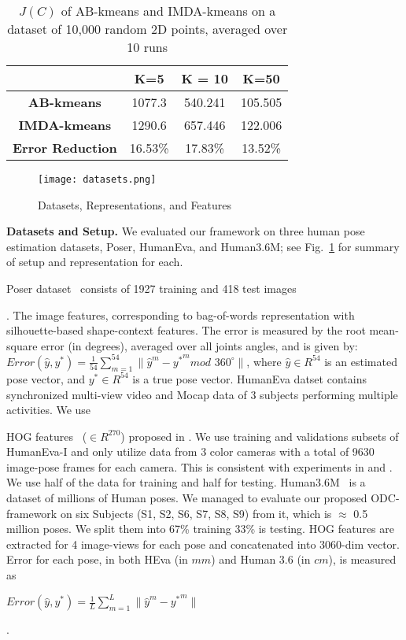 \begin{table}[htbp!]
  \centering
  \caption{$J(C)$ of AB-kmeans and  IMDA-kmeans on a dataset of 10,000 random 2D points, averaged over 10 runs}
    \label{tab:clustering}%
    \begin{tabular}{|c|c|c|c|}
    \hline
          & \textbf{K=5} & \textbf{K = 10} & \textbf{K=50} \\
              \hline
    \textbf{AB-kmeans} & 1077.3 & 540.241 & 105.505 \\
    \textbf{IMDA-kmeans} & 1290.6 & 657.446 & 122.006 \\
    \textbf{Error Reduction} & 16.53\% & 17.83\% & 13.52\% \\
    \bottomrule
    \end{tabular}%
\end{table}%


\begin{figure}[th!]
\texttt{[image: datasets.png]}
\caption{Datasets, Representations, and  Features}
\label{fig_datasets}
\end{figure}

\noindent \textbf{Datasets and Setup. } We evaluated our framework on three human pose estimation datasets, Poser, HumanEva, and Human3.6M; see Fig.~\ref{fig_datasets} for summary of setup and representation for each.  Poser dataset~\cite{Trig06} consists of 1927 training and 418 test images. The image features, corresponding to bag-of-words representation with silhouette-based shape-context features. The error is measured by the root mean-square error (in degrees), averaged over all joints angles, and is given by: \small$Error(\hat{y}, y^*) = \frac{1}{54} \sum_{m=1}^{54} \| {\hat{y}}^m  - {y^*}^m mod$  $360^\circ \|$\normalsize , where $\hat{y} \in R^{54}$ is an estimated pose vector, and $y^* \in R^{54}$ is a true pose vector. HumanEva datset \cite{SigalBB10} contains synchronized multi-view video and Mocap data of 3 subjects performing multiple activities. We use   HOG features~\cite{HOG05} (\small$\in R^{270}$\normalsize) proposed in \cite{Bo:2010}. We use training and validations subsets of HumanEva-I and only utilize data from 3 color cameras with a total of 9630 image-pose frames for each camera. This is consistent with experiments in \cite{Bo:2010} and \cite{Yamada:2012}. We use half of the data for training and half for testing. Human3.6M~\cite{human3m} is a dataset of millions of Human poses. We managed to evaluate our proposed ODC-framework on six Subjects (S1, S2, S6, S7, S8, S9) from it,  which is $\approx$ 0.5 million poses. We split them into  67\% training 33\% is testing. HOG features are extracted for 4 image-views for each  pose and concatenated into 3060-dim vector. Error for each pose, in both HEva (in $mm$) and Human 3.6 (in $cm$),  is measured as \small$Error(\hat{y},y^*) = \frac{1}{L} \sum_{m=1}^{L} \|\hat{y}^m - {y^*}^m\|$\normalsize{}. 


